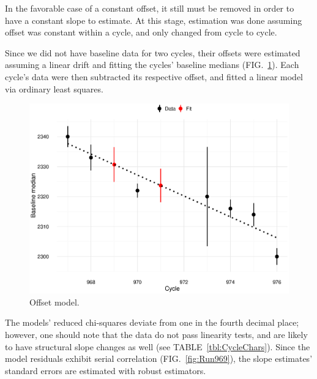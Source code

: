 \documentclass[reprint]{revtex4-1}
\newcommand{\scl}{.4}
\begin{document}
In the favorable case of a constant offset, it still must be removed in order to have a constant slope to estimate. At this stage, estimation was done assuming offset was constant within a cycle, and only changed from cycle to cycle.

Since we did not have baseline data for two cycles, their offsets were estimated assuming a linear drift and fitting the cycles' baseline medians (FIG.~\ref{fig:OffsetModel}). Each cycle's data were then subtracted its respective offset, and fitted a linear model via ordinary least squares.

\begin{figure}[h]
\includegraphics[scale=\scl]{img/Offset_model_Common_GAM.eps}
\caption{Offset model.\label{fig:OffsetModel}}
\end{figure}

The models' reduced chi-squares deviate from one in the fourth decimal place; however, one should note that the data do not pass linearity tests, and are likely to have structural slope changes as well (see TABLE~\ref{tbl:CycleChars}). Since the model residuals exhibit serial correlation (FIG.~\ref{fig:Run969}), the slope estimates' standard errors are estimated with robust estimators.
\end{document}
